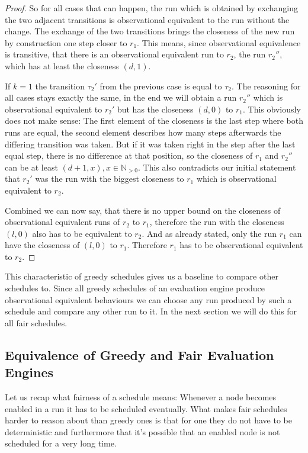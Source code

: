 \begin{proof}
  So for all cases that can happen, the run which is obtained by exchanging the two adjacent transitions is observational equivalent to the run without the change.
  The exchange of the two transitions brings the closeness of the new run by construction one step closer to \(r_1\).
  This means, since observational equivalence is transitive, that there is an observational equivalent run to \(r_2\), the run \(r_2''\),  which has at least the closeness \((d, 1)\).

  If \(k = 1\) the transition \(\tau_2'\) from the previous case is equal to \(\tau_2\).
  The reasoning for all cases stays exactly the same, in the end we will obtain a run \(r_2''\) which is observational equivalent to \(r_2'\) but has the closeness \((d, 0)\) to \(r_1\).
  This obviously does not make sense: The first element of the closeness is the last step where both runs are equal, the second element describes how many steps afterwards the differing transition was taken.
  But if it was taken right in the step after the last equal step, there is no difference at that position, so the closeness of \(r_1\) and \(r_2''\) can be at least \((d+1, x), x \in \mathbb{N}_{>0}\).
  This also contradicts our initial statement that \(r_2'\) was the run with the biggest closeness to \(r_1\) which is observational equivalent to \(r_2\).

  Combined we can now say, that there is no upper bound on the closeness of observational equivalent runs of \(r_2\) to \(r_1\), therefore the run with the closeness \((l, 0)\) also has to be equivalent to \(r_2\).
  And as already stated, only the run \(r_1\) can have the closeness of \((l, 0)\) to \(r_1\).
  Therefore \(r_1\) has to be observational equivalent to \(r_2\).
\end{proof}


This characteristic of greedy schedules gives us a baseline to compare other schedules to.
Since all greedy schedules of an evaluation engine produce observational equivalent behaviours we can choose any run produced by such a schedule and compare any other run to it.
In the next section we will do this for all fair schedules.

\subsection{Equivalence of Greedy and Fair Evaluation Engines}
\label{sec:behaviours:equivalence_without_timing:greedy_fair}

Let us recap what fairness of a schedule means: Whenever a node becomes enabled in a run it has to be scheduled eventually.
What makes fair schedules harder to reason about than greedy ones is that for one they do not have to be deterministic and furthermore that it's possible that an enabled node is not scheduled for a very long time.


